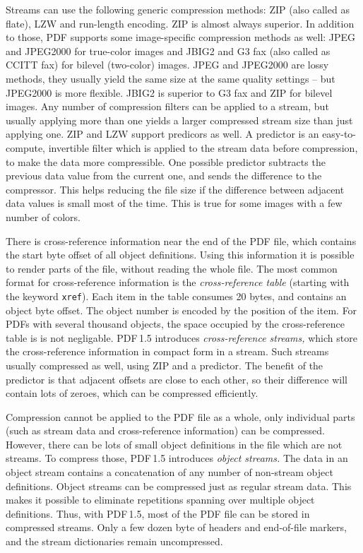 \documentclass{ltugproc}
\begin{document}
Streams can use the following generic compression methods: ZIP (also called
as flate), LZW and run-length encoding. ZIP is almost always superior. In
addition to those, PDF supports some image-specific compression methods as
well: JPEG and JPEG2000 for true-color images and JBIG2 and G3 fax (also
called as CCITT fax) for bilevel (two-color) images. JPEG and JPEG2000 are
lossy methods, they usually yield the same size at the same quality
settings -- but JPEG2000 is more flexible. JBIG2 is superior to G3 fax and
ZIP for bilevel images. Any number of compression filters can be applied to
a stream, but usually applying more than one yields a larger compressed
stream size than just applying one. ZIP and LZW support predicors as well. A
predictor is an easy-to-compute, invertible filter which is applied to the
stream data before compression, to make the data more compressible. One
possible predictor subtracts the previous data value from the current one,
and sends the difference to the compressor. This helps reducing the file
size if the difference between adjacent data values is small most of the
time. This is true for some images with a few number of colors.

There is cross-reference information near the end of the PDF file, which
contains the start byte offset of all object definitions. Using this
information it is possible to render parts of the file, without reading the
whole file. The most common format for cross-reference information is the
\emph{cross-reference table} (starting with the keyword \texttt{xref}). Each item
in the table consumes 20 bytes, and contains an object byte offset. The
object number is encoded by the position of the item. For PDFs with several
thousand objects, the space occupied by the cross-reference table is is not
negligable. PDF\,1.5 introduces \emph{cross-reference streams,} which store
the cross-reference information in compact form in a stream. Such streams
usually compressed as well, using ZIP and a predictor. The benefit of the
predictor is that adjacent offsets are close to each other, so their
difference will contain lots of zeroes, which can be compressed efficiently.

Compression cannot be applied to the PDF file as a whole, only individual
parts (such as stream data and cross-reference information) can be
compressed. However, there can be lots of small object definitions in the
file which are not streams. To compress those, PDF\,1.5 introduces
\emph{object streams.} The data in an object stream contains a concatenation
of any number of non-stream object definitions. Object streams can be
compressed just as regular stream data. This makes it possible to eliminate
repetitions spanning over multiple object definitions. Thus, with PDF\,1.5,
most of the PDF file can be stored in compressed streams. Only a few dozen
byte of headers and end-of-file markers, and the stream dictionaries remain
uncompressed.
\end{document}
